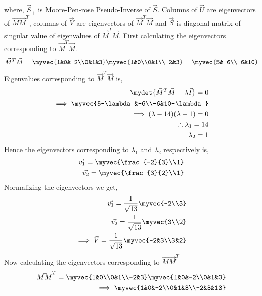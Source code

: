 where, $\vec{S}_+$ is Moore-Pen-rose Pseudo-Inverse of $\vec{S}$. Columns of $\vec{U}$ are eigenvectors of $\vec{MM}^T$, columns of $\vec{V}$ are eigenvectors of $\vec{M}^T\vec{M}$ and $\vec{S}$ is diagonal matrix of singular value of eigenvalues of $\vec{M}^T\vec{M}$. First calculating the eigenvectors corresponding to $\vec{M}^T\vec{M}$.
\begin{align}
\vec{M}^T\vec{M} =  \myvec{1&0&-2\\0&1&3} \myvec{1&0\\0&1\\-2&3} = \myvec{5&-6\\-6&10}
\end{align}
Eigenvalues corresponding to $\vec{M}^T\vec{M}$  is,
\begin{align}
\mydet{\vec{M}^T\vec{M}-\lambda\vec{I}} = 0\\
\implies \myvec{5-\lambda&-6\\-6&10-\lambda}\\
\implies (\lambda-14)(\lambda-1) = 0\\
\therefore \lambda_1 = 14 \label{eq:solutions/4/45/2/1/lambda1}\\ 
\lambda_2 = 1\label{eq:solutions/4/45/2/1/lambda2}
\end{align} 
Hence the eigenvectors corresponding to $\lambda_1$ and $\lambda_2$ respectively is,
\begin{align}
\vec{v_1} =\myvec{\frac{-2}{3}\\1}\\
\vec{v_2} =\myvec{\frac{3}{2}\\1}
\end{align}
Normalizing the eigenvectors we get,
\begin{align}
\vec{v_1} = \frac{1}{\sqrt{13}}\myvec{-2\\3}\\
\vec{v_2} = \frac{1}{\sqrt{13}}\myvec{3\\2}\\
\implies \vec{V} = \frac{1}{\sqrt{13}}\myvec{-2&3\\3&2}\label{eq:solutions/4/45/2/1/V}
\end{align}
Now calculating the eigenvectors corresponding to $\vec{MM}^T$
\begin{align}
\vec{MM}^T = \myvec{1&0\\0&1\\-2&3}\myvec{1&0&-2\\0&1&3} \\\implies \myvec{1&0&-2\\0&1&3\\-2&3&13}
\end{align}
